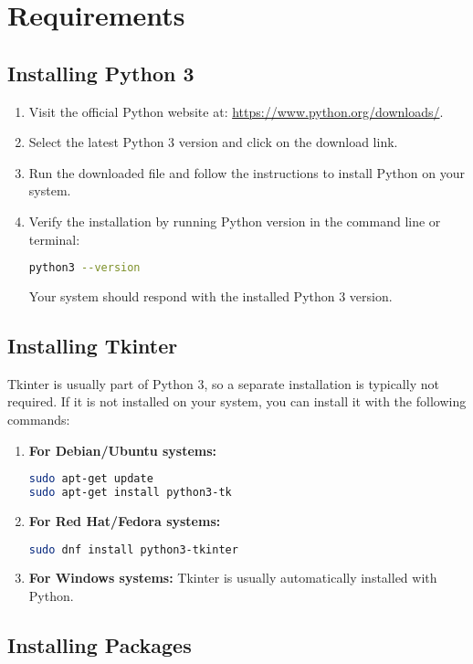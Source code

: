 \section{Requirements}
\subsection{Installing Python 3}
\begin{enumerate}
\item Visit the official Python website at: \url{https://www.python.org/downloads/}.
\item Select the latest Python 3 version and click on the download link.
\item Run the downloaded file and follow the instructions to install Python on your system.
\item Verify the installation by running Python version in the command line or terminal:
\begin{lstlisting}[language=bash]
python3 --version
\end{lstlisting}
Your system should respond with the installed Python 3 version.
\end{enumerate}

\clearpage
\subsection{Installing Tkinter}
Tkinter is usually part of Python 3, so a separate installation is typically not required. If it is not installed on your system, you can install it with the following commands:
\begin{enumerate}
\item \textbf{For Debian/Ubuntu systems:}
\begin{lstlisting}[language=bash]
sudo apt-get update
sudo apt-get install python3-tk
\end{lstlisting}
\item \textbf{For Red Hat/Fedora systems:}
\begin{lstlisting}[language=bash]
sudo dnf install python3-tkinter
\end{lstlisting}
\item \textbf{For Windows systems:}
Tkinter is usually automatically installed with Python.
\end{enumerate}

\subsection{Installing Packages}
